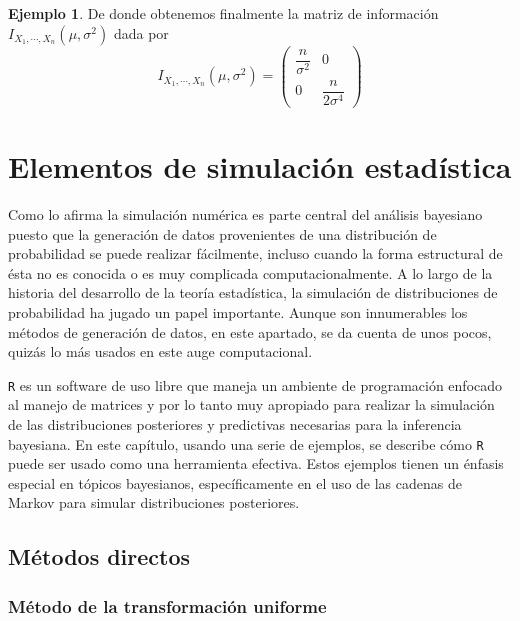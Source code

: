 \documentclass[
  10pt,
  spanish,
]{book}
\theoremstyle{definition}
\theoremstyle{definition}
\newtheorem{example}{Ejemplo}[chapter]
\theoremstyle{definition}
\theoremstyle{definition}
\theoremstyle{remark}
\begin{document}
\begin{example}
De donde obtenemos finalmente la matriz de información \(I_{X_1,\cdots,X_n}(\mu,\sigma^2)\) dada por
\begin{equation*}
I_{X_1,\cdots,X_n}(\mu,\sigma^2)=\begin{pmatrix}
\dfrac{n}{\sigma^2}&0\\
0&\dfrac{n}{2\sigma^4}
\end{pmatrix}
\end{equation*}
\end{example}

\hypertarget{elementos-de-simulaciuxf3n-estaduxedstica}{%
\chapter{Elementos de simulación estadística}\label{elementos-de-simulaciuxf3n-estaduxedstica}}

Como lo afirma \citet{Gelman03} la simulación numérica es parte central del análisis bayesiano puesto que la generación de datos provenientes de una distribución de probabilidad se puede realizar fácilmente, incluso cuando la forma estructural de ésta no es conocida o es muy complicada computacionalmente. A lo largo de la historia del desarrollo de la teoría estadística, la simulación de distribuciones de probabilidad ha jugado un papel importante. Aunque son innumerables los métodos de generación de datos, en este apartado, se da cuenta de unos pocos, quizás lo más usados en este auge computacional.

\texttt{R} es un software de uso libre que maneja un ambiente de programación enfocado al manejo de matrices y por lo tanto muy apropiado para realizar la simulación de las distribuciones posteriores y predictivas necesarias para la inferencia bayesiana. En este capítulo, usando una serie de ejemplos, se describe cómo
\texttt{R} puede ser usado como una herramienta efectiva. Estos ejemplos tienen un énfasis especial en tópicos bayesianos, específicamente en el uso de las cadenas de Markov para simular distribuciones posteriores.

\hypertarget{muxe9todos-directos}{%
\section{Métodos directos}\label{muxe9todos-directos}}

\hypertarget{muxe9todo-de-la-transformaciuxf3n-uniforme}{%
\subsection{Método de la transformación uniforme}\label{muxe9todo-de-la-transformaciuxf3n-uniforme}}
\end{document}
